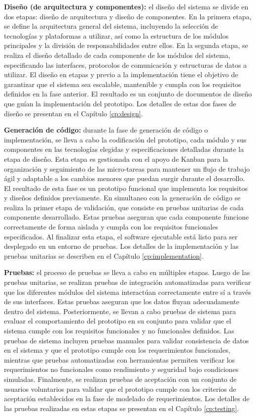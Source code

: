 \textbf{Diseño (de arquitectura y componentes):}
el diseño del sistema se divide en dos etapas: diseño de arquitectura y diseño de componentes. En la primera etapa, se define la arquitectura general del sistema, incluyendo la selección de tecnologías y plataformas a utilizar, así como la estructura de los módulos principales y la división de responsabilidades entre ellos. En la segunda etapa, se realiza el diseño detallado de cada componente de los módulos del sistema, especificando las interfaces, protocolos de comunicación y estructuras de datos a utilizar. El diseño en etapas y previo a la implementación tiene el objetivo de garantizar que el sistema sea escalable, mantenible y cumpla con los requisitos definidos en la fase anterior. El resultado es un conjunto de documentos de diseño que guían la implementación del prototipo. Los detalles de estas dos fases de diseño se presentan en el Capítulo \ref{cp:design}.

\textbf{Generación de código:}
durante la fase de generación de código o implementación, se lleva a cabo la codificación del prototipo, cada módulo y sus componentes en las tecnologías elegidas y especificaciones detalladas durante la etapa de diseño. Esta etapa es gestionada con el apoyo de Kanban para la organización y seguimiento de las micro-tareas para mantener un flujo de trabajo ágil y adaptable a los cambios menores que puedan surgir durante el desarrollo. El resultado de esta fase es un prototipo funcional que implementa los requisitos y diseños definidos previamente. En simultaneo con la generación de código se realiza la primer etapa de validación, que consiste en pruebas unitarias de cada componente desarrollado. Estas pruebas aseguran que cada componente funcione correctamente de forma aislada y cumpla con los requisitos funcionales especificados. Al finalizar esta etapa, el software ejecutable está listo para ser desplegado en un entorno de pruebas. Los detalles de la implementación y las pruebas unitarias se describen en el Capítulo \ref{cp:implementation}.

\textbf{Pruebas:} 
el proceso de pruebas se lleva a cabo en múltiples etapas. Luego de las pruebas unitarias, se realizan pruebas de integración automatizadas para verificar que los diferentes módulos del sistema interactúan correctamente entre sí a través de sus interfaces. Estas pruebas aseguran que los datos fluyan adecuadamente dentro del sistema. Posteriormente, se llevan a cabo pruebas de sistema para evaluar el comportamiento del prototipo en su conjunto para validar que el sistema cumple con los requisitos funcionales y no funcionales definidos. Las pruebas de sistema incluyen pruebas manuales para validar consistencia de datos en el sistema y que el prototipo cumple con los requerimientos funcionales, mientras que pruebas automatizadas con herramientas permiten verificar los requerimientos no funcionales como rendimiento y seguridad bajo condiciones simuladas. Finalmente, se realizan pruebas de aceptación con un conjunto de usuarios voluntarios para validar que el prototipo cumple con los criterios de aceptación establecidos en la fase de modelado de requerimientos. Los detalles de las pruebas realizadas en estas etapas se presentan en el Capítulo \ref{cp:testing}.

